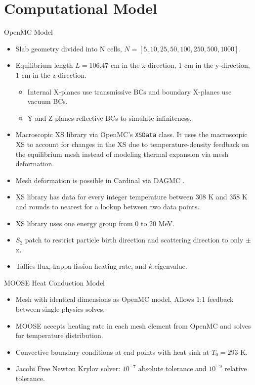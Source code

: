 \documentclass[9pt,t]{beamer}
\begin{document}
\section{Computational Model}
\begin{frame}{OpenMC Model}
    \pause
    \begin{itemize}
        \item <2-> Slab geometry divided into N cells, $N=[5, 10, 25, 50, 100, 250, 500, 1000]$.
        \item <3-> Equilibrium length $L=106.47$ cm in the x-direction, $1$ cm in the y-direction, $1$ cm in the z-direction.
        \begin{itemize}
            \item <4-> Internal X-planes use transmissive BCs and boundary X-planes use vacuum BCs.
            \item <5-> Y and Z-planes reflective BCs to simulate infiniteness.
        \end{itemize}
        \item <6-> Macroscopic XS library via OpenMC's \texttt{XSData} class. It uses the macroscopic XS to account for changes in the XS due to temperature-density feedback on the equilibrium mesh instead of modeling thermal expansion via mesh deformation.
        \item <7-> Mesh deformation is possible in Cardinal via DAGMC \cite{novak-2023}.
        \item <8-> XS library has data for every integer temperature between 308 K and 358 K and rounds to nearest for a lookup between two data points.
        \item <9-> XS library uses one energy group from $0$ to $20$ MeV.
        \item <10-> $S_{2}$ patch to restrict particle birth direction and scattering direction to only $\pm$x.
        \item <11->Tallies flux, kappa-fission heating rate, and $k$-eigenvalue.
    \end{itemize}
\end{frame}

\begin{frame}{MOOSE Heat Conduction Model}
    \pause
    \begin{itemize}
        \item <2-> Mesh with identical dimensions as OpenMC model. Allows 1:1 feedback between single physics solves.
        \item <3-> MOOSE accepts heating rate in each mesh element from OpenMC and solves for temperature distribution.
        \item <4-> Convective boundary conditions at end points with heat sink at $T_{0}=293$ K.
        \item <5-> Jacobi Free Newton Krylov solver: $10^{-7}$ absolute tolerance and $10^{-9}$ relative tolerance.
    \end{itemize}
\end{frame}
\end{document}

